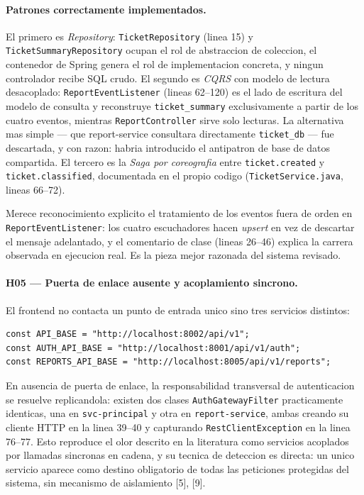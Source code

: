 \documentclass[10pt,a4paper]{article}
\begin{document}
\paragraph{Patrones correctamente implementados.}
El primero es \emph{Repository}: \texttt{TicketRepository} (linea 15) y
\texttt{TicketSummaryRepository} ocupan el rol de abstraccion de coleccion, el contenedor
de Spring genera el rol de implementacion concreta, y ningun controlador recibe SQL crudo.
El segundo es \emph{CQRS} con modelo de lectura desacoplado: \texttt{ReportEventListener}
(lineas 62--120) es el lado de escritura del modelo de consulta y reconstruye
\texttt{ticket\_summary} exclusivamente a partir de los cuatro eventos, mientras
\texttt{ReportController} sirve solo lecturas. La alternativa mas simple --- que
report-service consultara directamente \texttt{ticket\_db} --- fue descartada, y con razon:
habria introducido el antipatron de base de datos compartida. El tercero es la
\emph{Saga por coreografia} entre \texttt{ticket.created} y \texttt{ticket.classified},
documentada en el propio codigo (\texttt{TicketService.java}, lineas 66--72).

Merece reconocimiento explicito el tratamiento de los eventos fuera de orden en
\texttt{ReportEventListener}: los cuatro escuchadores hacen \emph{upsert} en vez de
descartar el mensaje adelantado, y el comentario de clase (lineas 26--46) explica la carrera
observada en ejecucion real. Es la pieza mejor razonada del sistema revisado.

\paragraph{H05 --- Puerta de enlace ausente y acoplamiento sincrono.}
El frontend no contacta un punto de entrada unico sino tres servicios distintos:

\begin{lstlisting}[caption={\texttt{frontend/app.js}, lineas 5--7},firstnumber=5]
const API_BASE = "http://localhost:8002/api/v1";
const AUTH_API_BASE = "http://localhost:8001/api/v1/auth";
const REPORTS_API_BASE = "http://localhost:8005/api/v1/reports";
\end{lstlisting}

En ausencia de puerta de enlace, la responsabilidad transversal de autenticacion se
resuelve replicandola: existen dos clases \texttt{AuthGatewayFilter} practicamente
identicas, una en \texttt{svc-principal} y otra en \texttt{report-service}, ambas creando su
cliente HTTP en la linea 39--40 y capturando \texttt{RestClientException} en la linea
76--77. Esto reproduce el olor descrito en la literatura como servicios acoplados por
llamadas sincronas en cadena, y su tecnica de deteccion es directa: un unico servicio
aparece como destino obligatorio de todas las peticiones protegidas del sistema, sin
mecanismo de aislamiento [5], [9].
\end{document}
